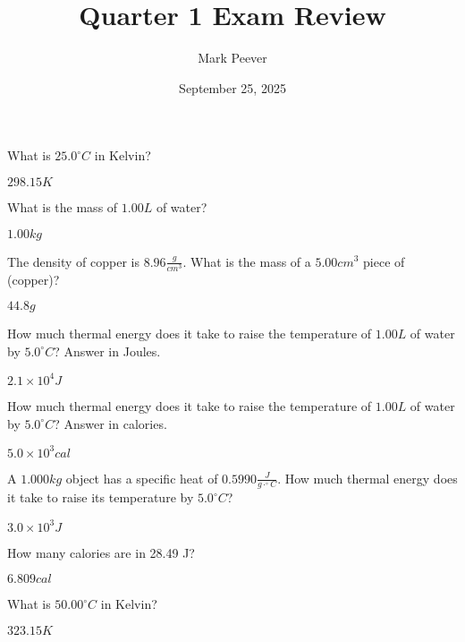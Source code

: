 \documentclass[11pt,addpoints]{exam}   	%
\title{Quarter 1 Exam Review}
\author{Mark Peever}
\date{September 25, 2025}							%
\begin{document}
\maketitle

\pointsinrightmargin
\printanswers

\begin{center}
\end{center}
\vspace{0.2in}

\begin{questions}
\question What is $25.0^{\circ}C$ in Kelvin?  
\begin{solution}
$298.15 K$
\end{solution}

\question What is the mass of $1.00 L$ of  water?
\begin{solution}
$1.00 kg$
\end{solution} 

\question The density of copper is $8.96 \frac{g}{cm^{3}}$. What is the mass of a $5.00 cm^3$ piece of  (copper)?
\begin{solution}
 $44.8 g$
\end{solution} 

\question How much thermal energy does it take to raise the temperature of $1.00 L$ of water by $5.0^{\circ}C$? Answer in Joules.
\begin{solution}
 $2.1 \times 10^4 J$
\end{solution} 

\pagebreak
\question How much thermal energy does it take to raise the temperature of $1.00 L$ of water by $5.0^{\circ}C$? Answer in calories.
\begin{solution}
 $5.0 \times 10^3 cal$
\end{solution} 

\question A $1.000 kg$ object has a specific heat of  $0.5990 \frac{J}{g \cdot ^{\circ}C}$.
How much thermal energy does it take to raise its temperature by $5.0^{\circ}C$? 
\begin{solution}
 $3.0 \times 10^3 J$
\end{solution} 

\question How many calories are in 28.49 J?
\begin{solution}
$6.809 cal$
\end{solution}

\question What is $50.00 ^{\circ}C$ in Kelvin?
\begin{solution}
$323.15 K$
\end{solution}

\end{questions}
\end{document}
